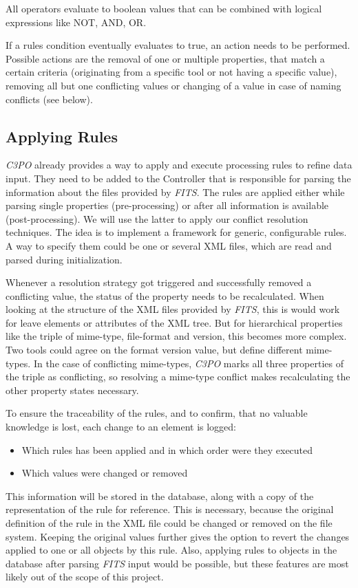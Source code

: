 \documentclass[a4paper,12pt]{article}
\begin{document}
All operators evaluate to boolean values that can be combined with logical expressions like NOT, AND, OR.

If a rules condition eventually evaluates to true, an action needs to be performed. Possible actions are the removal of one or multiple properties, that match a certain criteria (originating from a specific tool or not having a specific value), removing all but one conflicting values or changing of a value in case of naming conflicts (see below). 

\subsection{Applying Rules}
\emph{C3PO} already provides a way to apply and execute processing rules to refine data input. They need to be added to the Controller that is responsible for parsing the information about the files provided by \emph{FITS}. The rules are applied either while parsing single properties (pre-processing) or after all information is available (post-processing). We will use the latter to apply our conflict resolution techniques. The idea is to implement a framework for generic, configurable rules. A way to specify them could be one or several XML files, which are read and parsed during initialization. 

Whenever a resolution strategy got triggered and successfully removed a conflicting value, the status of the property needs to be recalculated. When looking at the structure of the XML files provided by \emph{FITS}, this is would work for leave elements or attributes of the XML tree. But for hierarchical properties like the triple of mime-type, file-format and version, this becomes more complex. Two tools could agree on the format version value, but define different mime-types. In the case of conflicting mime-types, \emph{C3PO} marks all three properties of the triple as conflicting, so resolving a mime-type conflict makes recalculating the other property states necessary.

To ensure the traceability of the rules, and to confirm, that no valuable knowledge is lost, each change to an element is logged:
\begin{itemize}
\item Which rules has been applied and in which order were they executed
\item Which values were changed or removed
\end{itemize}

This information will be stored in the database, along with a copy of the representation of the rule for reference. This is necessary, because the original definition of the rule in the XML file could be changed or removed on the file system. Keeping the original values further gives the option to revert the changes applied to one or all objects by this rule. Also, applying rules to objects in the database after parsing \emph{FITS} input would be possible, but these features are most likely out of the scope of this project.
\end{document}
